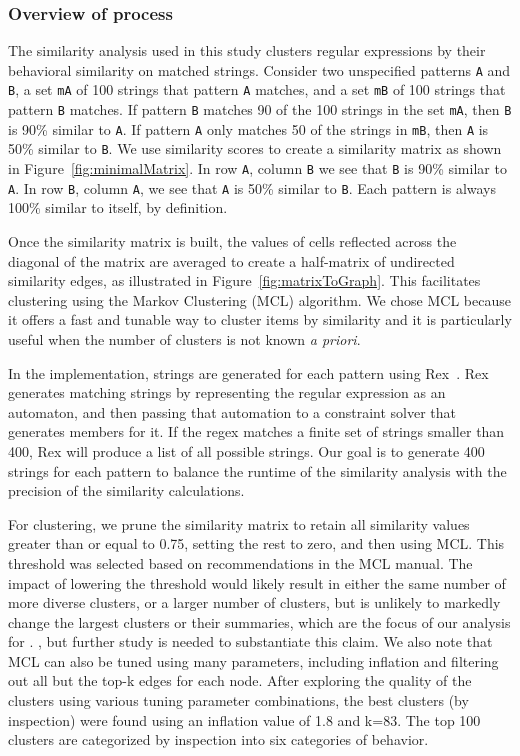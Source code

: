 \begin{itemize}
\subsubsection{Overview of process}

The similarity analysis used in this study clusters regular expressions by their behavioral similarity on matched strings.
Consider two unspecified patterns {\tt A} and {\tt B}, a set {\tt mA} of 100 strings that pattern {\tt A} matches, and a set {\tt mB} of 100 strings that pattern {\tt B} matches.
If pattern {\tt B} matches 90 of the 100 strings in the set {\tt mA}, then {\tt B} is 90\% similar to {\tt A}.
If pattern {\tt A} only matches 50 of the strings in {\tt mB}, then {\tt A} is 50\% similar to {\tt B}.
We use similarity scores to create a similarity matrix as shown in Figure~\ref{fig:minimalMatrix}.
In row {\tt A}, column {\tt B} we see that {\tt B} is 90\% similar to {\tt A}.
In row {\tt B}, column {\tt A}, we see that {\tt A} is 50\% similar to {\tt B}.  Each pattern is always 100\% similar to itself, by definition.

Once the similarity matrix is built, the values of cells reflected across the diagonal of the matrix are averaged to create a half-matrix of undirected similarity edges, as illustrated in Figure~\ref{fig:matrixToGraph}.
This facilitates clustering using the  Markov Clustering (MCL) algorithm.
We chose MCL  because it offers a fast and tunable way to cluster items by similarity and it is particularly useful when the number of clusters is not known \emph{a priori}.


In the implementation, strings are generated for each pattern using Rex~\cite{rex}.  Rex generates matching strings by representing the regular expression as an automaton, and then passing that automation to a constraint solver that generates members for it.  If the regex matches a finite set of strings smaller than 400, Rex will produce a list of all possible strings.
Our goal is to generate 400 strings for each pattern to balance the runtime of the similarity analysis with the precision of the similarity calculations.

For clustering, we prune the similarity matrix to retain all similarity values greater than or equal to 0.75, setting the rest to zero, and then using MCL.
This threshold was selected based on recommendations in the MCL manual. The impact of lowering the threshold would likely result  in either the same number of more diverse clusters, or a larger number of clusters, but is unlikely to markedly change the largest clusters or their summaries, which are the focus of our analysis for .
, but further study is needed to substantiate this claim.
We also note that MCL can also be tuned using many parameters, including inflation and filtering out all but the top-k edges for each node.
After exploring the quality of the clusters using various tuning parameter combinations, the best clusters (by inspection) were found using an inflation value of 1.8 and k=83.   The top 100 clusters are categorized by inspection into six categories of behavior.


\end{itemize}
